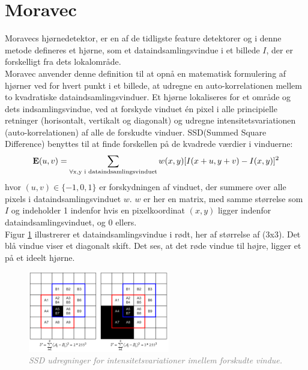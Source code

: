 \section{Moravec}\label{sec:moravec}
Moravecs hjørnedetektor\cite{moravec}, er en af de tidligste feature detektorer og i denne metode defineres et hjørne, som et dataindsamlingsvindue i et billede $I$, der er forskelligt fra dets lokalområde.
\\
Moravec anvender denne definition til at opnå en matematisk formulering af hjørner ved for hvert punkt i et billede, at udregne en auto-korrelationen mellem to kvadratiske dataindsamlingsvinduer. Et hjørne lokaliseres for et område og dets indsamlingsvindue, ved at forskyde vinduet én pixel i alle principielle retninger (horisontalt, vertikalt og diagonalt) og udregne intensitetsvariationen (auto-korrelationen) af alle de forskudte vinduer.  SSD(Summed Square Difference) benyttes til at finde forskellen på de kvadrede værdier i vinduerne:
\begin{equation}
\bold{E}(u,v)= \sum_{\forall \text{x,y i dataindsamlingsvinduet}} w(x,y)[I(x+u,y+v) - I(x,y)]^2
\label{moravec}     
\end{equation}
hvor $(u,v)\in \lbrace -1,0,1 \rbrace$ er forskydningen af vinduet, der summere over alle pixels i dataindsamlingsvinduet $w$. $w$ er her en matrix, med samme størrelse som $I$ og indeholder 1 indenfor hvis en pixelkoordinat $(x,y)$ ligger indenfor dataindsamlingsvinduet, og 0 ellers.
\\
Figur \ref{fig:moravec} illustrerer et dataindsamlingsvindue i rødt, her af størrelse af (3x3). Det blå vindue viser et diagonalt skift. Det ses, at det røde vindue til højre, ligger et på et ideelt hjørne. 
\begin{figure}[H]
    \centering
    \includegraphics[width=0.55\textwidth]{fig/25.png}
     \vspace{-1em}
    \begin{center}    
       \caption{\textcolor{gray}{\footnotesize \textit{ SSD udregninger for intensitetsvariationer imellem forskudte vindue. }}}
    \label{fig:moravec}
     \end{center}
     \vspace{-2.5em}
  \end{figure} \noindent   
